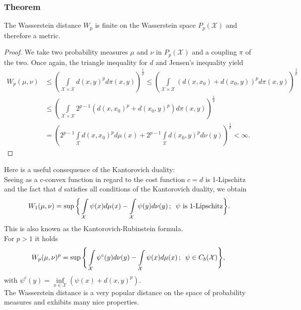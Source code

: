 \documentclass[11pt,a4paper]{article}
\begin{document}
\subsubsection{Theorem}
The Wasserstein distance $W_p$ is finite on the Wasserstein space $P_p(\mathcal{X})$ and therefore a metric.
\begin{proof}
We take two probability measures $\mu$ and $\nu$ in $P_p(\mathcal{X})$ and a coupling $\pi$ of the two. Once again, the triangle inequality for $d$ and Jensen's inequality yield\vspace{1em}\\
\begin{align*}
W_p(\mu,\nu) & \leq \left(\int\limits_{\mathcal{X\times{}X}}d(x,y)^p d\pi(x,y)\right)^\frac{1}{p} \leq \left(\int\limits_{\mathcal{X\times{}X}}(d(x,x_0)+d(x_0,y))^pd\pi(x,y)\right)^\frac{1}{p} \\ & \leq \left(\int\limits_{\mathcal{X\times{}X}}2^{p-1}\left(d(x,x_0)^p + d(x_0,y)^p\right)d\pi(x,y)\right)^\frac{1}{p} \\ & = \left(2^{p-1}\int\limits_{\mathcal{X}} d(x,x_0)^pd\mu(x) + 2^{p-1}\int\limits_{\mathcal{X}}d(x_0,y)^pd\nu(y)\right)^\frac{1}{p} < \infty.
\end{align*}
\end{proof}
\noindent{}Here is a useful consequence of the Kantorovich duality:\\
Seeing as a c-convex function in regard to the cost function $c=d$ is 1-Lipschitz and the fact that $d$ satisfies all conditions of the Kantorovich duality, we obtain
\[
W_1(\mu,\nu) = \sup\bigg\lbrace\int\limits_{\mathcal{X}}\psi(x)d\mu(x) - \int\limits_{\mathcal{X}}\psi(y)d\nu(y) \,;\hspace{0.5em} \psi \text{ is 1-Lipschitz}\bigg\rbrace.
\]
This is also known as the Kantorovich-Rubinstein formula.\vspace{1em}\\
For $p>1$ it holds 
\[
W_p(\mu,\nu)^p = \sup\Bigg\lbrace\int\limits_{\mathcal{X}}\psi^c(y)d\nu(y)-\int\limits_{\mathcal{X}}\psi(x)d\mu(x)\,;\hspace{0.5em} \psi\in{}C_b(\mathcal{X})\Bigg\rbrace,\vspace{1em}\\
\]
with $\psi^c(y)=\inf\limits_{x\in\mathcal{X}}\left(\psi(x)+d(x,y)^p\right)$.\vspace{2em}\\
The Wasserstein distance is a very popular distance on the space of probability measures and exhibits many nice properties. 
\end{document}
